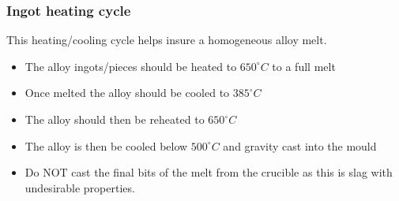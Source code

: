 \subsubsection{Ingot heating cycle}

This heating/cooling cycle helps insure a homogeneous alloy melt.
\begin{itemize}
\item The \MgZnCa alloy ingots/pieces should be heated to $650^{\circ}C$ to a full melt
\item Once melted the alloy should be cooled to $385^{\circ}C$
\item The alloy should then be reheated to $650^{\circ}C$
\item The alloy is then be cooled below $500^{\circ}C$ and gravity cast into the mould
\item Do NOT cast the final bits of the melt from the crucible as this is slag with undesirable properties. 
\end{itemize}